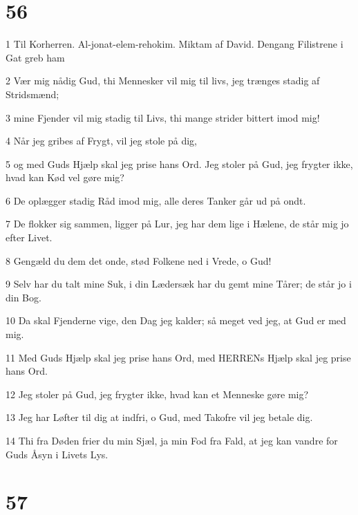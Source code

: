 \chapter{56}

\par 1 Til Korherren. Al-jonat-elem-rehokim. Miktam af David. Dengang Filistrene i Gat greb ham
\par 2 Vær mig nådig Gud, thi Mennesker vil mig til livs, jeg trænges stadig af Stridsmænd;
\par 3 mine Fjender vil mig stadig til Livs, thi mange strider bittert imod mig!
\par 4 Når jeg gribes af Frygt, vil jeg stole på dig,
\par 5 og med Guds Hjælp skal jeg prise hans Ord. Jeg stoler på Gud, jeg frygter ikke, hvad kan Kød vel gøre mig?
\par 6 De oplægger stadig Råd imod mig, alle deres Tanker går ud på ondt.
\par 7 De flokker sig sammen, ligger på Lur, jeg har dem lige i Hælene, de står mig jo efter Livet.
\par 8 Gengæld du dem det onde, stød Folkene ned i Vrede, o Gud!
\par 9 Selv har du talt mine Suk, i din Lædersæk har du gemt mine Tårer; de står jo i din Bog.
\par 10 Da skal Fjenderne vige, den Dag jeg kalder; så meget ved jeg, at Gud er med mig.
\par 11 Med Guds Hjælp skal jeg prise hans Ord, med HERRENs Hjælp skal jeg prise hans Ord.
\par 12 Jeg stoler på Gud, jeg frygter ikke, hvad kan et Menneske gøre mig?
\par 13 Jeg har Løfter til dig at indfri, o Gud, med Takofre vil jeg betale dig.
\par 14 Thi fra Døden frier du min Sjæl, ja min Fod fra Fald, at jeg kan vandre for Guds Åsyn i Livets Lys.

\chapter{57}

